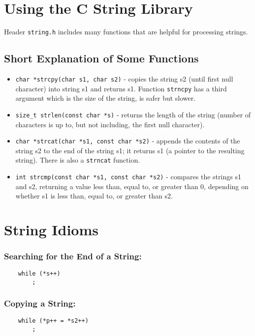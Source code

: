 \documentclass[openany]{book}
\begin{document}
    \section{Using the C String Library}
    Header \texttt{string.h} includes many functions that are helpful for processing strings.

    \subsection*{Short Explanation of Some Functions}
    \begin{itemize}
    \item \texttt{char *strcpy(char s1, char s2)} - copies the string s2 (until first null character) into string s1 and
        returns s1. Function \texttt{strncpy} has a third argument which is the size of the string, is safer but slower.
    \item \texttt{size\_t strlen(const char *s)} - returns the length of the string (number of characters is up to,
        but not including, the first null character).
    \item \texttt{char *strcat(char *s1, const char *s2)} - appends the contents of the string s2 to the end of the string s1; it returns s1 (a pointer to the resulting string). There is also a \texttt{strncat} function.
    \item \texttt{int strcmp(const char *s1, const char *s2)} - compares the strings s1 and s2, returning a value less than, equal to, or greater than 0, depending on whether s1 is less than, equal to, or greater than s2.
    \end{itemize}

    \section{String Idioms}

    \subsubsection*{Searching for the End of a String:}
    \begin{lstlisting}
    while (*s++)
        ;
    \end{lstlisting}

    \subsubsection*{Copying a String:}
    \begin{lstlisting}
    while (*p++ = *s2++)
        ;
    \end{lstlisting}
\end{document}
